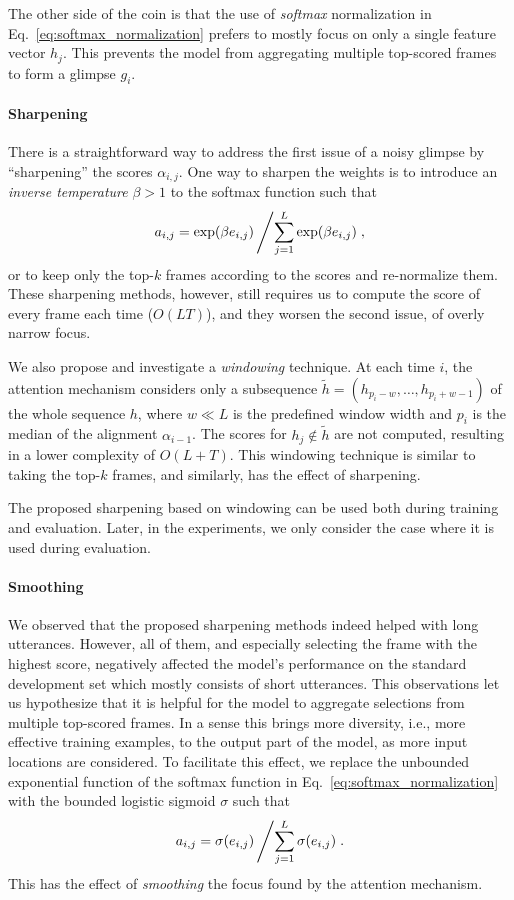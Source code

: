 \documentclass{article} %
\begin{document}
The other side of the coin is that the use of {\it softmax} normalization in
Eq.~\eqref{eq:softmax_normalization} prefers to mostly focus on only a single
feature vector $h_j$. This prevents the model from aggregating multiple
top-scored frames to form a glimpse $g_i$.  

\paragraph{Sharpening}

There is a straightforward way to address the first issue of a noisy glimpse by
``sharpening'' the scores $\alpha_{i,j}$. One way to sharpen the weights is to
introduce an {\it inverse temperature} $\beta > 1$ to the softmax function such
that
\[
    a_{i,j}=\exp(\beta e_{i,j})\left/ \sum_{j=1}^{L}\exp(\beta e_{i,j})\right.,
\]
or to keep only the top-$k$ frames according to the scores and re-normalize
them.  These sharpening methods, however, still requires us to compute the score
of every frame each time ($O(LT)$), and they worsen the second issue, of overly narrow 
focus.

We also propose and investigate a {\it windowing} technique.
At each time $i$, the attention mechanism considers only a subsequence
$\tilde{h} = (h_{p_i-w}, \ldots, h_{p_i+w-1})$ of the whole sequence $h$, where 
$w \ll L$ is the predefined window width and $p_i$ is the median of the alignment
$\alpha_{i-1}$. The scores for $h_j \notin \tilde{h}$ are not computed, 
resulting in a lower complexity of $O(L+T)$.
This windowing technique is similar to taking the top-$k$ frames, and similarly,
has the effect of sharpening.

The proposed sharpening based on windowing can be used both during training and
evaluation. Later, in the experiments, we only consider the case where it is
used during evaluation.

\paragraph{Smoothing}

We observed that the proposed sharpening methods indeed
helped with long utterances. However, all of them, and
especially selecting the frame with the highest score,
negatively affected the model's performance on the standard
development set which mostly consists of short utterances.
This observations let us hypothesize that it is helpful for
the model to aggregate selections from multiple top-scored
frames. In a sense this brings more diversity, i.e., more
effective training examples, to the output part of the model,
as more input locations are considered.
To facilitate this effect, we replace the
unbounded exponential
function of the softmax function in
Eq.~\eqref{eq:softmax_normalization} with the
bounded logistic sigmoid $\sigma$ such that 
\[
    a_{i,j}=\sigma(e_{i,j})\left/\sum_{j=1}^{L}\sigma(e_{i,j})\right..
\]
This has the effect of {\it smoothing} the focus found by the attention
mechanism.
\end{document}
